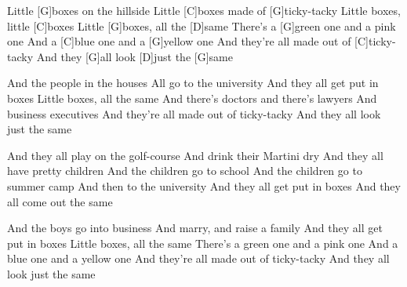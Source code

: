 
\sloka
Little [G]boxes on the hillside
Little [C]boxes made of [G]ticky-tacky
Little boxes, little [C]boxes
Little [G]boxes, all the [D]same
There’s a [G]green one and a pink one
And a [C]blue one and a [G]yellow one
And they’re all made out of [C]ticky-tacky
And they [G]all look [D]just the [G]same

\sloka
And the people in the houses
All go to the university
And they all get put in boxes
Little boxes, all the same
And there’s doctors and there’s lawyers
And business executives
And they’re all made out of ticky-tacky
And they all look just the same

\sloka
And they all play on the golf-course
And drink their Martini dry
And they all have pretty children
And the children go to school
And the children go to summer camp
And then to the university
And they all get put in boxes
And they all come out the same

\sloka
And the boys go into business
And marry, and raise a family
And they all get put in boxes
Little boxes, all the same
There’s a green one and a pink one
And a blue one and a yellow one
And they’re all made out of ticky-tacky
And they all look just the same
